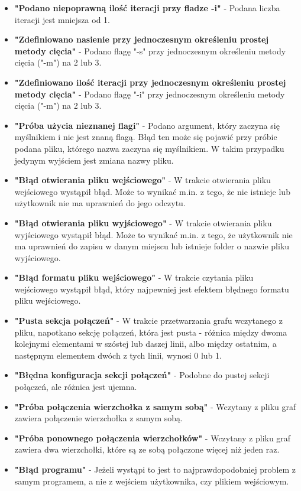 \documentclass{article}
\begin{document}
\begin{itemize}
    \item \textbf{"Podano niepoprawną ilość iteracji przy fladze -i"} - Podana liczba iteracji jest mniejsza od 1.
    \item \textbf{"Zdefiniowano nasienie przy jednoczesnym określeniu prostej metody cięcia"} - Podano flagę "-s" przy jednoczesnym określeniu metody cięcia ("-m") na 2 lub 3.
    \item \textbf{"Zdefiniowano ilość iteracji przy jednoczesnym określeniu prostej metody cięcia"} - Podano flagę "-i" przy jednoczesnym określeniu metody cięcia ("-m") na 2 lub 3.
    \item \textbf{"Próba użycia nieznanej flagi"} - Podano argument, który zaczyna się myślnikiem i nie jest znaną flagą. Błąd ten może się pojawić przy próbie podana pliku, którego nazwa zaczyna się myślnikiem. W takim przypadku jedynym wyjściem jest zmiana nazwy pliku.
    \item \textbf{"Błąd otwierania pliku wejściowego"} - W trakcie otwierania pliku wejściowego wystąpił błąd. Może to wynikać m.in. z tego, że nie istnieje lub użytkownik nie ma uprawnień do jego odczytu.
    \item \textbf{"Błąd otwierania pliku wyjściowego"} - W trakcie otwierania pliku wyjściowego wystąpił błąd. Może to wynikać m.in. z tego, że użytkownik nie ma uprawnień do zapisu w danym miejscu lub istnieje folder o nazwie pliku wyjściowego.
    \item \textbf{"Błąd formatu pliku wejściowego"} - W trakcie czytania pliku wejściowego wystąpił błąd, który najpewniej jest efektem błędnego formatu pliku wejściowego.
    \item \textbf{"Pusta sekcja połączeń"} - W trakcie przetwarzania grafu wczytanego z pliku, napotkano sekcję połączeń, która jest pusta - różnica między dwoma kolejnymi elementami w szóstej lub daszej linii, albo między ostatnim, a następnym elementem dwóch z tych linii, wynosi 0 lub 1.
    \item \textbf{"Błędna konfiguracja sekcji połączeń"} - Podobne do pustej sekcji połączeń, ale różnica jest ujemna.
    \item \textbf{"Próba połączenia wierzchołka z samym sobą"} - Wczytany z pliku graf zawiera połączenie wierzchołka z samym sobą.
    \item \textbf{"Próba ponownego połączenia wierzchołków"} - Wczytany z pliku graf zawiera dwa wierzchołki, które są ze sobą połączone więcej niż jeden raz.
    \item \textbf{"Błąd programu"} - Jeżeli wystąpi to jest to najprawdopodobniej problem z samym programem, a nie z wejściem użytkownika, czy plikiem wejściowym.
\end{itemize}
\end{document}

